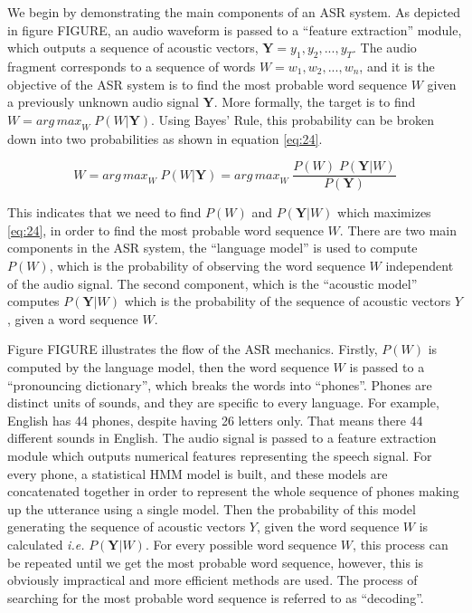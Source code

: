 We begin by demonstrating the main components of an \ac{ASR} system. As depicted in figure FIGURE, an audio waveform is passed to a \enquote{feature extraction} module, which outputs a sequence of acoustic vectors, $\mathbf{Y} = y_1,y_2,...,y_T$. The audio fragment corresponds to a sequence of words $W = w_1,w_2,...,w_n$, and it is the objective of the \ac{ASR} system is to find the most probable word sequence $W$ given a previously unknown audio signal $\mathbf{Y}$.
More formally, the target is to find $W = {arg \, max}_{W} \; P(W|\mathbf{Y})$. Using Bayes' Rule, this probability can be broken down into two probabilities as shown in equation \ref{eq:24}.


\begin{equation}
\label{eq:24}
W = {arg \, max}_{W} \; P(W|\mathbf{Y}) = {arg \, max}_{W} \; \frac{P(W) \; P(\mathbf{Y}|W)}{P(\mathbf{Y})}
\end{equation}

This indicates that we need to find $P(W)$ and $P(\mathbf{Y}|W)$ which maximizes \ref{eq:24}, in order to find the most probable word sequence $W$.
There are two main components in the \ac{ASR} system, the \enquote{language model} is used to compute $P(W)$, which is the probability of observing the word sequence $W$ independent of the audio signal. The second component, which is the \enquote{acoustic model} computes $P(\mathbf{Y}|W)$ which is the probability of the sequence of acoustic vectors $Y$, given a word sequence $W$.

Figure FIGURE illustrates the flow of the \ac{ASR} mechanics. Firstly, $P(W)$ is computed by the language model, then the word sequence $W$ is passed to a \enquote{pronouncing dictionary}, which breaks the words into \enquote{phones}. Phones are distinct units of sounds, and they are specific to every language. For example, English has 44 phones, despite having 26 letters only. That means there 44 different sounds in English. The audio signal is passed to a feature extraction module which outputs numerical features representing the speech signal. For every phone, a statistical \ac{HMM} model is built, and these models are concatenated together in order to represent the whole sequence of phones making up the utterance using a single model. Then the probability of this model generating the sequence of acoustic vectors $Y$, given the word sequence $W$ is calculated \textit{i.e.} $P(\mathbf{Y}|W)$. For every possible word sequence $W$, this process can be repeated until we get the most probable word sequence, however, this is obviously impractical and more efficient methods are used. The process of searching for the most probable word sequence is referred to as \enquote{decoding}.

